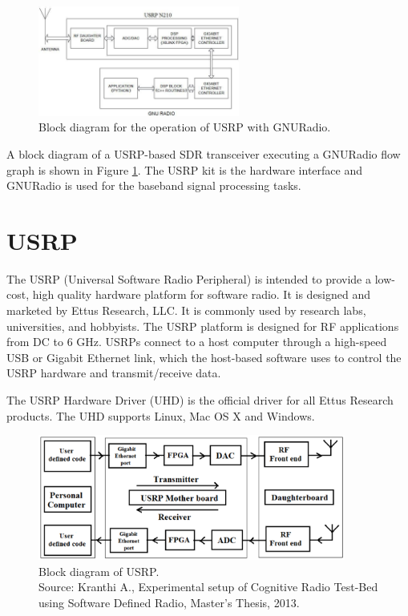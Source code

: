 \begin{figure}
  \centering
  \includegraphics[width=0.59\textwidth]{usrpGNURadioBlock}
  \caption[USRP operation with GNURadio]{Block diagram for the operation of USRP
  with GNURadio.}
  \label{usrpGNURadioBlock}
\end{figure}

A block diagram of a USRP-based SDR transceiver executing a GNURadio flow 
graph is shown in Figure \ref{usrpGNURadioBlock}. The USRP kit is the hardware
interface and GNURadio is used for the baseband signal processing tasks.


\section{USRP}

The USRP (Universal Software Radio Peripheral) is intended to provide a 
low-cost, high quality hardware platform for software radio. It is designed
and marketed by Ettus Research, LLC. It is commonly used by research labs,
universities, and hobbyists. The USRP platform is designed for RF applications
from DC to 6 GHz. USRPs connect to a host computer through a high-speed USB or
Gigabit Ethernet link, which the host-based software uses to control the USRP
hardware and transmit/receive data.

The USRP Hardware Driver (UHD) is the official driver for all Ettus Research
products. The UHD supports Linux, Mac OS X and Windows.

\begin{figure}
\centering
\includegraphics[width=0.9\textwidth]{usrpBlock}
\caption[Block diagram of USRP]{Block diagram of USRP.\\
\footnotesize{Source: Kranthi A., Experimental setup of Cognitive Radio 
Test-Bed using Software Defined Radio, Master's Thesis, 2013.}}
\label{usrpBlock}
\end{figure}

